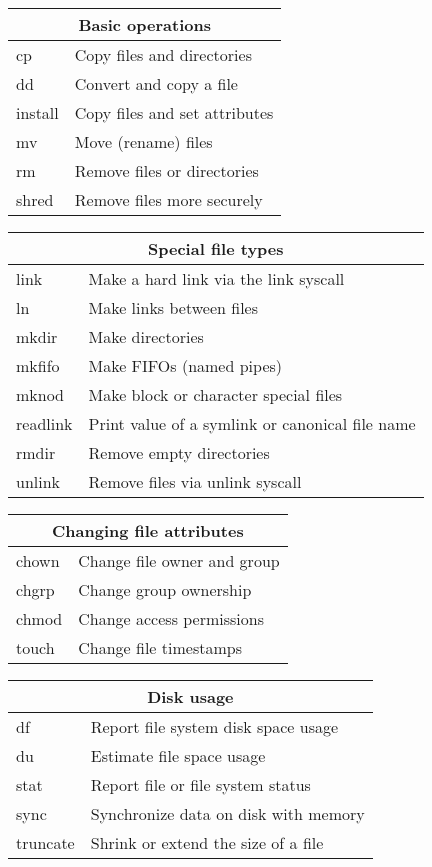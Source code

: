 \begin{tabularx}{0.75\textwidth}{|l|X|}
\hline
\multicolumn{2}{|c|}{Basic operations}\\ \hline
cp  &                 Copy files and directories\\
dd  &                 Convert and copy a file\\
install  &            Copy files and set attributes\\
mv  &                 Move (rename) files\\
rm  &                 Remove files or directories\\
shred  &              Remove files more securely\\
\hline
\end{tabularx}

\begin{tabularx}{0.75\textwidth}{|l|X|}
\hline
\multicolumn{2}{|c|}{Special file types}\\ \hline
link  &               Make a hard link via the link syscall\\
ln  &                 Make links between files\\
mkdir  &              Make directories\\
mkfifo  &             Make FIFOs (named pipes)\\
mknod  &              Make block or character special files\\
readlink  &           Print value of a symlink or canonical file name\\
rmdir  &              Remove empty directories\\
unlink  &             Remove files via unlink syscall\\
\hline
\end{tabularx}

\begin{tabularx}{0.75\textwidth}{|l|X|}
\hline
\multicolumn{2}{|c|}{Changing file attributes}\\ \hline
chown  &              Change file owner and group\\
chgrp  &              Change group ownership\\
chmod  &              Change access permissions\\
touch  &              Change file timestamps\\
\hline
\end{tabularx}

\begin{tabularx}{0.75\textwidth}{|l|X|}
\hline
\multicolumn{2}{|c|}{Disk usage}\\ \hline
df  &                 Report file system disk space usage\\
du  &                 Estimate file space usage\\
stat  &               Report file or file system status\\
sync  &               Synchronize data on disk with memory\\
truncate  &           Shrink or extend the size of a file\\
\hline
\end{tabularx}

